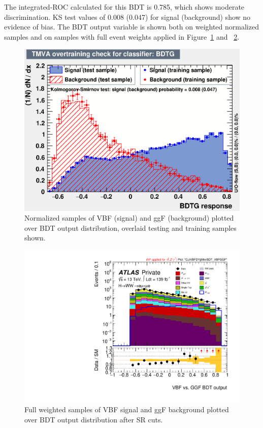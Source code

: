 The integrated-ROC calculated for this BDT is 0.785, which shows moderate discrimination. KS test values of 0.008 (0.047) for signal (background) show no evidence of bias. The BDT output variable is shown both on weighted normalized samples and on samples with full event weights applied in Figure~\ref{fig:ggFVBFBDTresult} and ~\ref{fig:ggFVBFBDTresult2}. 

\begin{figure}[!htbp]
\centering
  \includegraphics[width=.45\linewidth]{Pictures/ggFVBF/overtrain_BDTG.eps}
\caption{Normalized samples of VBF (signal) and ggF (background) plotted over BDT output distribution, overlaid testing and training samples shown.}
\label{fig:ggFVBFBDTresult}
\end{figure}

\begin{figure}[!htbp]
\centering
  \includegraphics[width=.45\linewidth]{Pictures/run2-emme-CutVBFDYjjMin-BDT_VBFGGF-log.pdf}
\caption{Full weighted samples of VBF signal and ggF background plotted over BDT output distribution after SR cuts.}
\label{fig:ggFVBFBDTresult2}
\end{figure}

%


